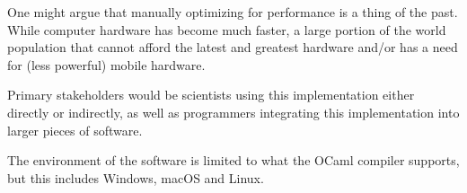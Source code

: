 \documentclass{article}
\begin{document}

One might argue that manually optimizing for performance is a thing of the past.
While
computer hardware has become much faster,
a large portion of the world population that cannot afford the latest and
greatest hardware
and/or has a need for (less powerful) mobile hardware.

Primary stakeholders would be scientists using this implementation either
directly or indirectly, as well as programmers integrating this implementation
into larger pieces of software.

The environment of the software is limited to what the OCaml compiler supports,
but this includes Windows, macOS and Linux.

\end{document}
